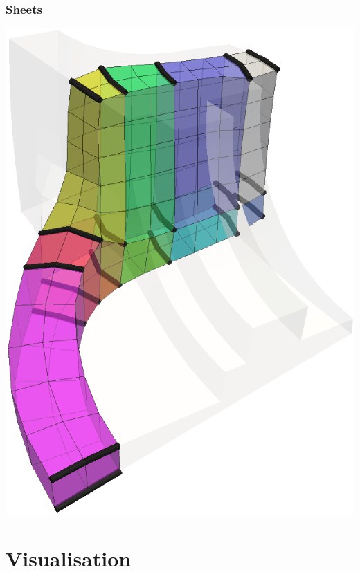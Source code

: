 \documentclass[12pt]{beamer}
\begin{document}
\begin{frame}[fragile]
  \frametitle{Sheets}
  \begin{center}
    \includegraphics[height=0.8\textheight]{./images/ex2-sheet1.png}
  \end{center}
\end{frame}

\section{Visualisation}

\end{document}
